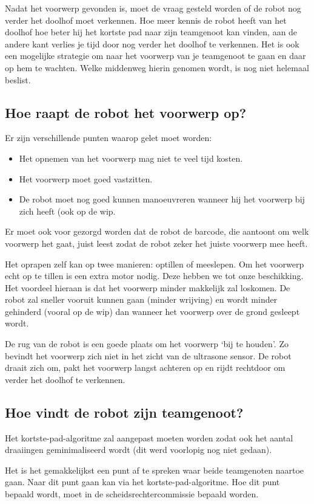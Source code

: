 \documentclass{peno}
\begin{document}
Nadat het voorwerp gevonden is, moet de vraag gesteld worden of de robot nog verder het doolhof moet verkennen. Hoe meer kennis de robot heeft van het doolhof hoe beter hij het kortste pad naar zijn teamgenoot kan vinden, aan de andere kant verlies je tijd door nog verder het doolhof te verkennen. Het is ook een mogelijke strategie om naar het voorwerp van je teamgenoot te gaan en daar op hem te wachten. Welke middenweg hierin genomen wordt, is nog niet helemaal beslist.

\subsection*{Hoe raapt de robot het voorwerp op?}
Er zijn verschillende punten waarop gelet moet worden:
\begin{itemize}
\item Het opnemen van het voorwerp mag niet te veel tijd kosten.
\item Het voorwerp moet goed vastzitten.
\item De robot moet nog goed kunnen manoeuvreren wanneer hij het voorwerp bij zich heeft (ook op de wip.
\end{itemize} 

Er moet ook voor gezorgd worden dat de robot de barcode, die aantoont om welk voorwerp het gaat, juist leest zodat de robot zeker het juiste voorwerp mee heeft.

Het oprapen zelf kan op twee manieren: optillen of meeslepen. Om het voorwerp echt op te tillen is een extra motor nodig. Deze hebben we tot onze beschikking. Het voordeel hieraan is dat het voorwerp minder makkelijk zal loskomen. De robot zal sneller vooruit kunnen gaan (minder wrijving) en wordt minder gehinderd (vooral op de wip) dan wanneer het voorwerp over de grond gesleept wordt.

De rug van de robot is een goede plaats om het voorwerp `bij te houden'. Zo bevindt het voorwerp zich niet in het zicht van de ultrasone sensor. De robot draait zich om, pakt het voorwerp langst achteren op en rijdt rechtdoor om verder het doolhof te verkennen.

\subsection*{Hoe vindt de robot zijn teamgenoot?}
Het kortste-pad-algoritme zal aangepast moeten worden zodat ook het aantal draaiingen geminimaliseerd wordt (dit werd voorlopig nog niet gedaan).

Het is het gemakkelijkst een punt af te spreken waar beide teamgenoten naartoe gaan. Naar dit punt gaan kan via het kortste-pad-algoritme. Hoe dit punt bepaald wordt, moet in de scheidsrechtercommissie bepaald worden.
\end{document}

